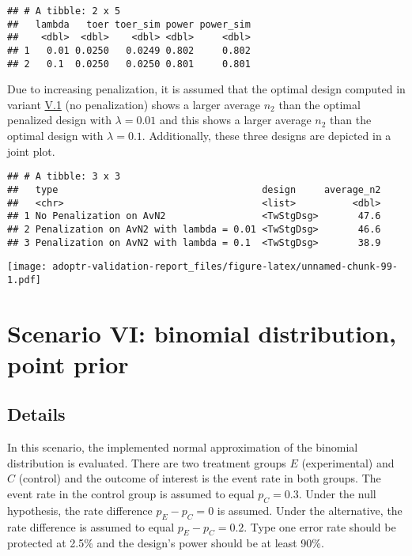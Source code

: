 \documentclass[
]{book}
\begin{document}
\begin{verbatim}
## # A tibble: 2 x 5
##   lambda   toer toer_sim power power_sim
##    <dbl>  <dbl>    <dbl> <dbl>     <dbl>
## 1   0.01 0.0250   0.0249 0.802     0.802
## 2   0.1  0.0250   0.0250 0.801     0.801
\end{verbatim}

Due to increasing penalization, it is assumed that the optimal design
computed in variant \protect\hyperlink{variantV_1}{V.1} (no penalization) shows a larger
average \(n_2\) than the optimal penalized design with \(\lambda = 0.01\)
and this shows a larger average \(n_2\) than the optimal design
with \(\lambda = 0.1\).
Additionally, these three designs are depicted in a joint plot.

\begin{verbatim}
## # A tibble: 3 x 3
##   type                                    design     average_n2
##   <chr>                                   <list>          <dbl>
## 1 No Penalization on AvN2                 <TwStgDsg>       47.6
## 2 Penalization on AvN2 with lambda = 0.01 <TwStgDsg>       46.6
## 3 Penalization on AvN2 with lambda = 0.1  <TwStgDsg>       38.9
\end{verbatim}

\texttt{[image: adoptr-validation-report\_files/figure-latex/unnamed-chunk-99-1.pdf]}

\hypertarget{scenarioVI}{%
\chapter{Scenario VI: binomial distribution, point prior}\label{scenarioVI}}

\hypertarget{details-5}{%
\section{Details}\label{details-5}}

In this scenario, the implemented normal approximation of the binomial
distribution is evaluated.
There are two treatment groups \(E\) (experimental) and \(C\) (control)
and the outcome of interest is the event rate in both groups.
The event rate in the control group is assumed to equal \(p_C = 0.3\).
Under the null hypothesis, the rate difference \(p_E - p_C = 0\) is assumed.
Under the alternative, the rate difference is assumed to equal \(p_E - p_C = 0.2\).
Type one error rate should be protected at 2.5\% and the design's power should
be at least 90\%.
\end{document}
